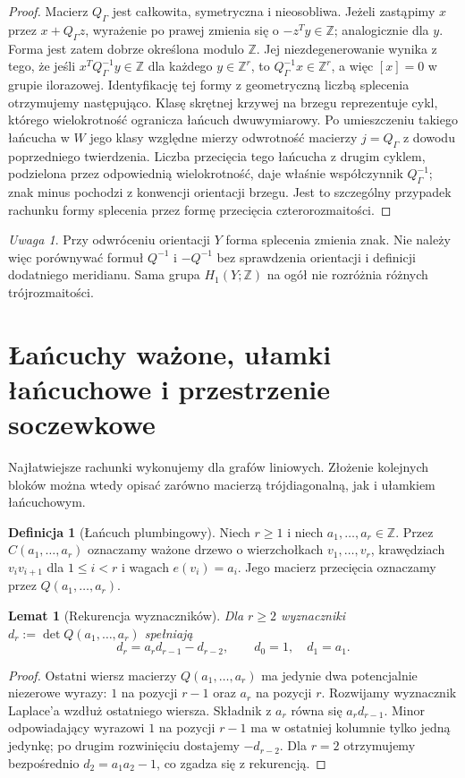 \documentclass[11pt,a4paper]{report}
\numberwithin{equation}{section}
\theoremstyle{plain}
\newtheorem{lemat}[twierdzenie]{Lemat}
\theoremstyle{definition}
\newtheorem{definicja}[twierdzenie]{Definicja}
\theoremstyle{remark}
\newtheorem{uwaga}[twierdzenie]{Uwaga}
\begin{document}
\begin{proof}
Macierz $Q_\Gamma$ jest całkowita, symetryczna i nieosobliwa.
Jeżeli zastąpimy $x$ przez $x+Q_\Gamma z$, wyrażenie po prawej
zmienia się o $-z^Ty\in\mathbb Z$; analogicznie dla $y$.
Forma jest zatem dobrze określona modulo $\mathbb Z$.
Jej niezdegenerowanie wynika z tego, że jeśli
$x^TQ_\Gamma^{-1}y\in\mathbb Z$ dla każdego $y\in\mathbb Z^r$,
to $Q_\Gamma^{-1}x\in\mathbb Z^r$, a więc
$[x]=0$ w grupie ilorazowej. Identyfikację tej formy
z geometryczną liczbą splecenia otrzymujemy następująco.
Klasę skrętnej krzywej na brzegu reprezentuje cykl, którego
wielokrotność ogranicza łańcuch dwuwymiarowy.
Po umieszczeniu takiego łańcucha w $W$ jego klasy
względne mierzy odwrotność macierzy $j=Q_\Gamma$ z
dowodu poprzedniego twierdzenia. Liczba przecięcia tego
łańcucha z drugim cyklem, podzielona przez odpowiednią
wielokrotność, daje właśnie współczynnik $Q_\Gamma^{-1}$;
znak minus pochodzi z konwencji orientacji brzegu.
Jest to szczególny przypadek rachunku formy splecenia
przez formę przecięcia czterorozmaitości.
\end{proof}

\begin{uwaga}
Przy odwróceniu orientacji $Y$ forma splecenia zmienia znak.
Nie należy więc porównywać formuł $Q^{-1}$ i $-Q^{-1}$
bez sprawdzenia orientacji i definicji dodatniego meridianu.
Sama grupa $H_1(Y;\mathbb Z)$ na ogół nie rozróżnia
różnych trójrozmaitości.
\end{uwaga}

\section{Łańcuchy ważone, ułamki łańcuchowe i przestrzenie soczewkowe}
\label{sec:tg-plumbing-chains}

Najłatwiejsze rachunki wykonujemy dla grafów liniowych.
Złożenie kolejnych bloków można wtedy opisać zarówno
macierzą trójdiagonalną, jak i ułamkiem łańcuchowym.

\begin{definicja}[Łańcuch plumbingowy]
Niech $r\ge1$ i niech $a_1,\dots,a_r\in\mathbb Z$.
Przez $C(a_1,\dots,a_r)$ oznaczamy ważone drzewo o
wierzchołkach $v_1,\dots,v_r$, krawędziach
$v_iv_{i+1}$ dla $1\le i<r$ i wagach $e(v_i)=a_i$.
Jego macierz przecięcia oznaczamy przez $Q(a_1,\dots,a_r)$.
\end{definicja}

\begin{lemat}[Rekurencja wyznaczników]
Dla $r\ge2$ wyznaczniki
$d_r:=\det Q(a_1,\dots,a_r)$ spełniają
\[
d_r=a_r d_{r-1}-d_{r-2},\qquad
 d_0=1,\quad d_1=a_1.
\]
\end{lemat}
\begin{proof}
Ostatni wiersz macierzy $Q(a_1,\dots,a_r)$ ma
jedynie dwa potencjalnie niezerowe wyrazy: $1$ na pozycji
$r-1$ oraz $a_r$ na pozycji $r$. Rozwijamy wyznacznik
Laplace'a wzdłuż ostatniego wiersza. Składnik z $a_r$
równa się $a_r d_{r-1}$. Minor odpowiadający wyrazowi $1$
na pozycji $r-1$ ma w ostatniej kolumnie tylko jedną
jedynkę; po drugim rozwinięciu dostajemy $-d_{r-2}$.
Dla $r=2$ otrzymujemy bezpośrednio
$d_2=a_1a_2-1$, co zgadza się z rekurencją.
\end{proof}
\end{document}
